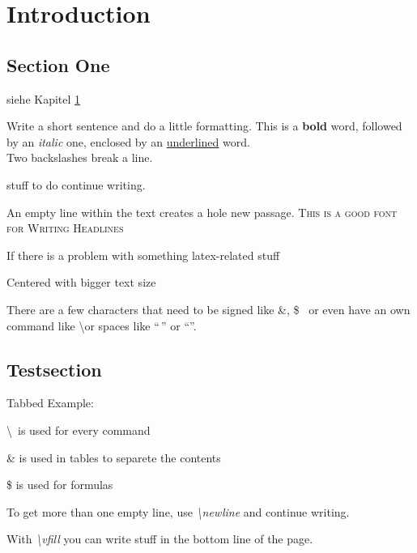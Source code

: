 \chapter{Introduction}
\label{sec:introduction}

\section{Section One}
\label{sec:section-one}

siehe Kapitel \ref{sec:introduction}

Write a short sentence and do a little formatting. This is a \textbf{bold} word, followed by an \textit{italic} one, enclosed by an \underline{underlined} word. \\
Two backslashes break a line. 


stuff     to do  continue writing.

An empty line within the text creates a hole new passage. \textsc{This is a good font for Writing Headlines} 


If there is a problem with something latex-related stuff  

\begin{center}
\huge Centered with bigger text size
\end{center}

There are a few characters that need to be signed like \&, \$ \, or even have an own command like \textbackslash or spaces like "`\,"' or "`\quad"'.

\section{Testsection}
\label{sec:testsection}

Tabbed Example:

\qquad \textbackslash \, is used for every command

\qquad \& is used in tables to separete the contents

\qquad \$ is used for formulas

To get more than one empty line, use \textit{\textbackslash newline} \newline \newline \newline and continue writing.

\vfill
With \textit{\textbackslash vfill} you can write stuff in the bottom line of the page.


